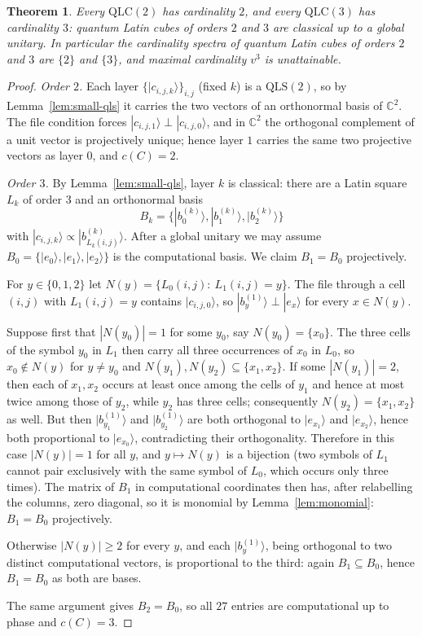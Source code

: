 \documentclass[11pt]{amsart}
\newtheorem{theorem}{Theorem}[section]
\theoremstyle{definition}
\newcommand{\C}{\mathbb{C}}
\newcommand{\ket}[1]{|#1\rangle}
\newcommand{\QLS}{\mathrm{QLS}}
\newcommand{\QLC}{\mathrm{QLC}}
\begin{document}
\begin{theorem}\label{thm:small}
Every $\QLC(2)$ has cardinality $2$, and every $\QLC(3)$ has cardinality
$3$: quantum Latin cubes of orders $2$ and $3$ are classical up to a
global unitary.  In particular the cardinality spectra of quantum Latin
cubes of orders $2$ and $3$ are $\{2\}$ and $\{3\}$, and maximal
cardinality $v^3$ is unattainable.
\end{theorem}

\begin{proof}
\emph{Order $2$.}  Each layer $\{\ket{c_{i,j,k}}\}_{i,j}$ (fixed $k$) is a
$\QLS(2)$, so by Lemma~\ref{lem:small-qls} it carries the two vectors of
an orthonormal basis of $\C^2$.  The file condition forces
$\ket{c_{i,j,1}}\perp\ket{c_{i,j,0}}$, and in $\C^2$ the orthogonal
complement of a unit vector is projectively unique; hence layer $1$
carries the same two projective vectors as layer $0$, and $c(C)=2$.

\emph{Order $3$.}  By Lemma~\ref{lem:small-qls}, layer $k$ is classical:
there are a Latin square $L_k$ of order $3$ and an orthonormal basis
\[
B_k=\{\ket{b^{(k)}_0},\ket{b^{(k)}_1},\ket{b^{(k)}_2}\}
\]
with
$\ket{c_{i,j,k}}\propto\ket{b^{(k)}_{L_k(i,j)}}$.  After a global unitary
we may assume $B_0=\{\ket{e_0},\ket{e_1},\ket{e_2}\}$ is the computational
basis.  We claim $B_1=B_0$ projectively.

For $y\in\{0,1,2\}$ let $N(y)=\{L_0(i,j):\ L_1(i,j)=y\}$.  The file
through a cell $(i,j)$ with $L_1(i,j)=y$ contains $\ket{c_{i,j,0}}$, so
$\ket{b^{(1)}_y}\perp\ket{e_x}$ for every $x\in N(y)$.

Suppose first that $|N(y_0)|=1$ for some $y_0$, say $N(y_0)=\{x_0\}$.
The three cells of the symbol $y_0$ in $L_1$ then carry all three
occurrences of $x_0$ in $L_0$, so $x_0\notin N(y)$ for $y\ne y_0$ and
$N(y_1),N(y_2)\subseteq\{x_1,x_2\}$.  If some $|N(y_1)|=2$, then each of
$x_1,x_2$ occurs at least once among the cells of $y_1$ and hence at most
twice among those of $y_2$, while $y_2$ has three cells; consequently
$N(y_2)=\{x_1,x_2\}$ as well.  But then $\ket{b^{(1)}_{y_1}}$ and
$\ket{b^{(1)}_{y_2}}$ are both orthogonal to $\ket{e_{x_1}}$ and
$\ket{e_{x_2}}$, hence both proportional to $\ket{e_{x_0}}$,
contradicting their orthogonality.  Therefore in this case
$|N(y)|=1$ for all $y$, and $y\mapsto N(y)$ is a bijection (two symbols of
$L_1$ cannot pair exclusively with the same symbol of $L_0$, which occurs
only three times).  The matrix of $B_1$ in computational coordinates then
has, after relabelling the columns, zero diagonal, so it is monomial by
Lemma~\ref{lem:monomial}: $B_1=B_0$ projectively.

Otherwise $|N(y)|\ge2$ for every $y$, and each $\ket{b^{(1)}_y}$, being
orthogonal to two distinct computational vectors, is proportional to the
third: again $B_1\subseteq B_0$, hence $B_1=B_0$ as both are bases.

The same argument gives $B_2=B_0$, so all $27$ entries are computational
up to phase and $c(C)=3$.
\end{proof}
\end{document}
